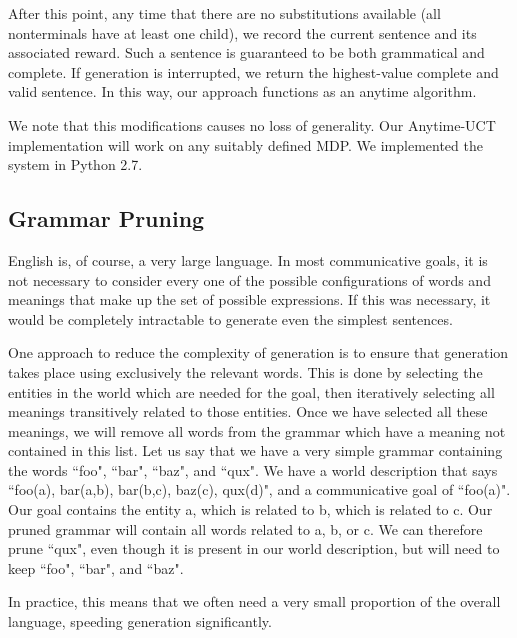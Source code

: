 After this point, any time that there are no substitutions
available (all nonterminals have at least one child), we record the
current sentence and its associated reward.  Such a sentence is
guaranteed to be both grammatical and complete.  If generation is
interrupted, we return the highest-value complete and valid sentence.
In this way, our approach functions as an anytime algorithm.

We note that this modifications causes no loss of
generality.  Our Anytime-UCT implementation will work on any suitably
defined MDP.  We implemented the system in Python 2.7.

\subsection{Grammar Pruning}

English is, of course, a very large language.  In most communicative goals, it is
not necessary to consider every one of the possible configurations of words and
meanings that make up the set of possible expressions.  If this was necessary,
it would be completely intractable to generate even the simplest sentences.

One approach to reduce the complexity of generation is to ensure that
generation takes place using exclusively the relevant words.  This is done by selecting
the entities in the world which are needed for the goal, then iteratively selecting all
meanings transitively related to those entities.  Once we have selected all these meanings,
we will remove all words from the grammar which have a meaning not contained in this list.
Let us say that we have a very simple grammar containing the words ``foo", ``bar", ``baz", and ``qux".
We have a world description that says ``foo(a), bar(a,b), bar(b,c), baz(c), qux(d)", and a communicative
goal of ``foo(a)".  Our goal contains the entity a, which is related to b, which is related to c.  Our pruned
grammar will contain all words related to a, b, or c.  We can therefore prune ``qux", even though
it is present in our world description, but will need to keep ``foo", ``bar", and ``baz".

In practice, this means that we often need a very small proportion of the overall language,
speeding generation significantly.